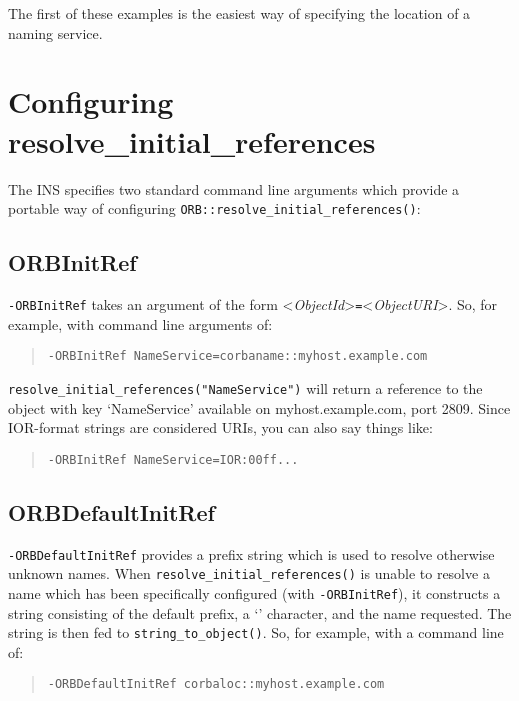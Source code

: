 \documentclass[11pt,twoside,a4paper]{book}
\newcommand{\code}[1]{\texttt{#1}}
\newcommand{\op}[1]{\texttt{#1()}}
\newcommand{\cmdline}[1]{\texttt{#1}}
\newcommand{\corbauri}{\begingroup \urlstyle{tt}\Url}
\begin{document}
\noindent The first of these examples is the easiest way of specifying
the location of a naming service.


\section{Configuring resolve\_initial\_references}
\label{sec:insargs}

The INS specifies two standard command line arguments which provide a
portable way of configuring \op{ORB::resolve\_initial\_references}:


\subsection{ORBInitRef}

\cmdline{-ORBInitRef} takes an argument of the form
<\textit{ObjectId}>\cmdline{=}<\textit{ObjectURI}>. So, for example,
with command line arguments of:

\begin{quote}
\cmdline{-ORBInitRef NameService=corbaname::myhost.example.com}
\end{quote}

\noindent \code{resolve\_initial\_references("NameService")} will
return a reference to the object with key `NameService' available on
myhost.example.com, port 2809. Since IOR-format strings are considered
URIs, you can also say things like:

\begin{quote}
\cmdline{-ORBInitRef NameService=IOR:00ff...}
\end{quote}


\subsection{ORBDefaultInitRef}

\cmdline{-ORBDefaultInitRef} provides a prefix string which is used to
resolve otherwise unknown names. When
\op{resolve\_initial\_references} is unable to resolve a name which
has been specifically configured (with \cmdline{-ORBInitRef}), it
constructs a string consisting of the default prefix, a `\corbauri{/}'
character, and the name requested.  The string is then fed to
\op{string\_to\_object}. So, for example, with a command line of:

\begin{quote}
\cmdline{-ORBDefaultInitRef corbaloc::myhost.example.com}
\end{quote}
\end{document}
